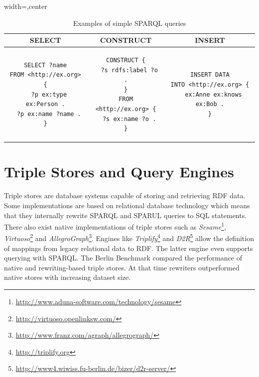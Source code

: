 \begin{table}[!h]
\centering
\begin{adjustbox}{width=\textwidth,center}  %
\begin{tabular}{ccc}
\toprule
\textbf{SELECT} & \textbf{CONSTRUCT} & \textbf{INSERT} \\
\midrule

\begin{minipage}{0.3\linewidth}
\begin{verbatim}
SELECT ?name
FROM <http://ex.org> {
  ?p ex:type ex:Person .
  ?p ex:name ?name .
}
\end{verbatim}
\end{minipage}
&
\begin{minipage}{0.3\linewidth}
\begin{verbatim}
CONSTRUCT {
  ?s rdfs:label ?o .
}
FROM <http://ex.org> {
  ?s ex:name ?o .
}
\end{verbatim}
\end{minipage}
&
\begin{minipage}{0.35\linewidth}
\begin{verbatim}
INSERT DATA
INTO <http://ex.org> {
  ex:Anne ex:knows ex:Bob .
}
\end{verbatim}
\end{minipage}
\\
\bottomrule
\end{tabular}
\end{adjustbox}
\caption{Examples of simple SPARQL queries}
\label{tab:SPARQLExample}
\end{table}

\section{Triple Stores and Query Engines}
Triple stores are database systems capable of storing and retrieving RDF data.
Some implementations are based on relational database technology which means
that they internally rewrite SPARQL and SPARUL queries to SQL
statements. There also exist native implementations of triple stores such as
\emph{Sesame}\footnote{\url{http://www.aduna-software.com/technology/sesame}},
\emph{Virtuoso}\footnote{\url{http://virtuoso.openlinksw.com/}} and
\emph{AllegroGraph}\footnote{\url{http://www.franz.com/agraph/allegrograph/}}.
Engines like
\emph{Triplify}\footnote{\url{http://triplify.org}}
and \emph{D2R}\footnote{\url{http://www4.wiwiss.fu-berlin.de/bizer/d2r-server/}}
allow the definition of mappings from legacy relational data to RDF. The latter
engine even supports querying with SPARQL. The Berlin
Benchmark\cite{BerlinSparql} compared the performance of native and
rewriting-based triple stores. At that time rewriters outperformed native stores
with increasing dataset size.


